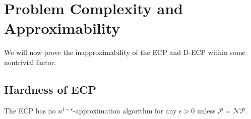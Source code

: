 \chapter{Problem Complexity and Approximability}%
\label{ch:complexity}

We will now prove the inapproximability of the \acrshort{ECP} and
\acrshort{D-ECP} within some nontrivial factor.

\section{Hardness of \acrshort{ECP}}%
\label{sub:ecp-hardness}

\begin{theorem}
	\label{th:approximability}
	The \acrfull{ECP} has no $n^{1-\epsilon} $-approximation algorithm for
	any $\epsilon > 0$ unless $\mathcal{P} = \mathcal{NP}  $.
\end{theorem}

